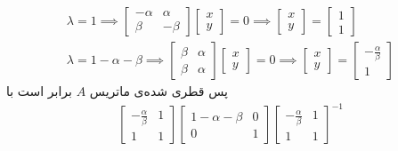 \begin{gather*} %
    \lambda = 1 \implies 
    \begin{bmatrix}
        -\alpha & \alpha \\
        \beta & -\beta
    \end{bmatrix}
    \begin{bmatrix}
        x\\
        y
    \end{bmatrix} = 0
    \implies
    \begin{bmatrix}
        x\\
        y
    \end{bmatrix}
    =
    \begin{bmatrix}
        1\\
        1
    \end{bmatrix}
    \\
    \lambda = 1 - \alpha - \beta \implies 
    \begin{bmatrix}
        \beta & \alpha \\
        \beta & \alpha
    \end{bmatrix}
    \begin{bmatrix}
        x\\
        y
    \end{bmatrix} = 0
    \implies
    \begin{bmatrix}
        x\\
        y
    \end{bmatrix}
    =
    \begin{bmatrix}
        -\frac{\alpha}{\beta}\\
        1
    \end{bmatrix}
\end{gather*}
پس قطری شده‌ی ماتریس
$A$
برابر است با
\begin{gather*}
    \begin{bmatrix}
        -\frac{\alpha}{\beta} & 1\\
        1 & 1
    \end{bmatrix}
    \begin{bmatrix}
        1 - \alpha - \beta & 0\\
        0 & 1
    \end{bmatrix}
    \begin{bmatrix}
        -\frac{\alpha}{\beta} & 1\\
        1 & 1
    \end{bmatrix} ^ {-1}
\end{gather*}
